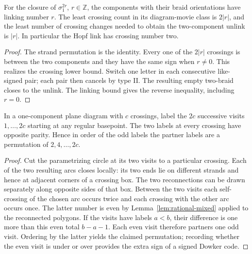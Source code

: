 \begin{corollary}
For the closure of $\sigma_1^{2r}$, $r\in\mathbb Z$, the components with
their braid orientations have linking number $r$. The least crossing count
in its diagram-movie class is $2|r|$, and the least number of crossing
changes needed to obtain the two-component unlink is $|r|$.
In particular the Hopf link has crossing number two.
\end{corollary}
\begin{proof}
The strand permutation is the identity. Every one of the $2|r|$
crossings is between the two components and they have the same sign
when $r\ne0$. This realizes the crossing lower bound. Switch one letter
in each consecutive like-signed pair; each pair then cancels by type II.
The resulting empty two-braid closes to the unlink. The linking bound
gives the reverse inequality, including $r=0$.
\end{proof}

\begin{theorem}
In a one-component plane diagram with $c$ crossings, label the $2c$
successive visits $1,\ldots,2c$ starting at any regular basepoint.
The two labels at every crossing have opposite parity. Hence in order
of the odd labels the partner labels are a permutation of $2,4,\ldots,2c$.
\end{theorem}
\begin{proof}
Cut the parametrizing circle at its two visits to a particular crossing.
Each of the two resulting arcs closes locally: its two ends lie on
different strands and hence at adjacent corners of a crossing box.
The two reconnections can be drawn separately along opposite sides of
that box. Between the two visits each self-crossing of the chosen arc
occurs twice and each crossing with the other arc occurs once. The
latter number is even by Lemma~\ref{lem:rational-mixed} applied to
the reconnected polygons. If the visits have labels $a<b$, their
difference is one more than this even total $b-a-1$. Each even visit
therefore partners one odd visit. Ordering by the latter yields the
claimed permutation; recording whether the even visit is under or over
provides the extra sign of a signed Dowker code.
\end{proof}

